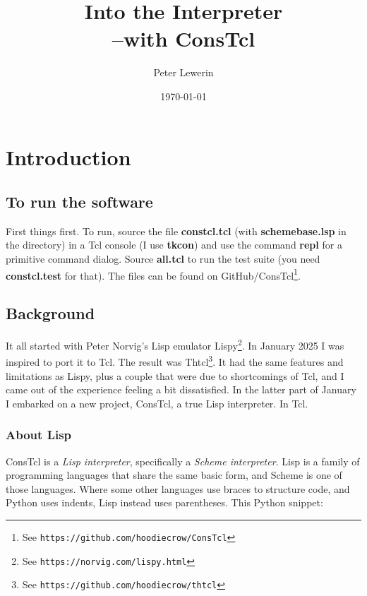 \documentclass[twoside,9pt]{report}
\title{Into the Interpreter\\--with ConsTcl}
\author{Peter Lewerin}
\date{\today}
\begin{document}
\pagestyle{headings}
\maketitle
\tableofcontents

\chapter{Introduction}
\label{introduction}
\section{To run the software}
\label{to-run-the-software}


First things first. To run, source the file \textbf{constcl.tcl} (with
\textbf{schemebase.lsp} in the directory) in a Tcl console (I use
\textbf{tkcon}) and use the command \textbf{repl} for a primitive command
dialog. Source \textbf{all.tcl} to run the test suite (you need
\textbf{constcl.test} for that). The files can be found on GitHub/ConsTcl\footnote{See
\texttt{https://github.com/hoodiecrow/ConsTcl}}.

\section{Background}
\label{background}

It all started with Peter Norvig's Lisp emulator
Lispy\footnote{See \texttt{https://norvig.com/lispy.html}}. In January 2025 I
was inspired to port it to Tcl. The result was Thtcl\footnote{See
\texttt{https://github.com/hoodiecrow/thtcl}}. It had the same features and
limitations as Lispy, plus a couple that were due to shortcomings of Tcl, and I
came out of the experience feeling a bit dissatisfied. In the latter part of
January I embarked on a new project, ConsTcl, a true Lisp interpreter. In Tcl.

\subsection{About Lisp}
\label{about-lisp}

ConsTcl is a \emph{Lisp interpreter}, specifically a \emph{Scheme interpreter}.
Lisp is a family of programming languages that share the same basic form, and
Scheme is one of those languages. Where some other languages use braces to
structure code, and Python uses indents, Lisp instead uses parentheses. This
Python snippet:
\end{document}
